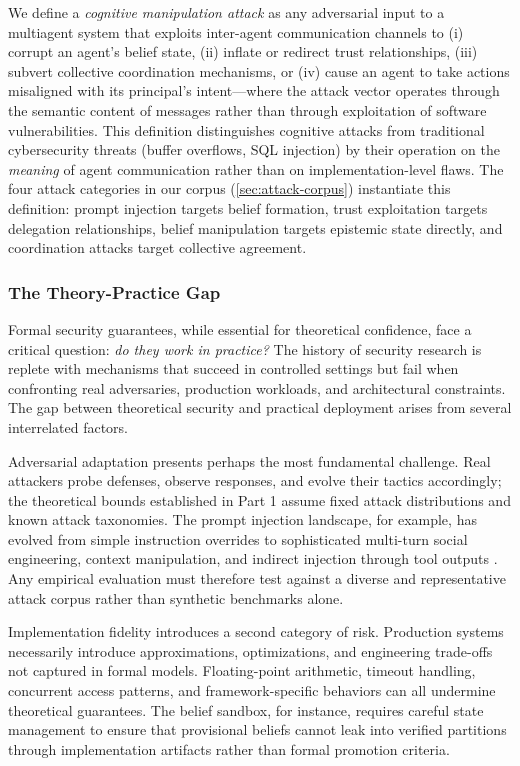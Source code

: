 \documentclass[
]{article}
\begin{document}
We define a \emph{cognitive manipulation attack} as any adversarial
input to a multiagent system that exploits inter-agent communication
channels to (i) corrupt an agent's belief state, (ii) inflate or
redirect trust relationships, (iii) subvert collective coordination
mechanisms, or (iv) cause an agent to take actions misaligned with its
principal's intent---where the attack vector operates through the
semantic content of messages rather than through exploitation of
software vulnerabilities. This definition distinguishes cognitive
attacks from traditional cybersecurity threats (buffer overflows, SQL
injection) by their operation on the \emph{meaning} of agent
communication rather than on implementation-level flaws. The four attack
categories in our corpus (\cref{sec:attack-corpus}) instantiate this
definition: prompt injection targets belief formation, trust
exploitation targets delegation relationships, belief manipulation
targets epistemic state directly, and coordination attacks target
collective agreement.

\subsubsection{The Theory-Practice Gap}\label{the-theory-practice-gap}

Formal security guarantees, while essential for theoretical confidence,
face a critical question: \emph{do they work in practice?} The history
of security research is replete with mechanisms that succeed in
controlled settings but fail when confronting real adversaries,
production workloads, and architectural constraints. The gap between
theoretical security and practical deployment arises from several
interrelated factors.

Adversarial adaptation presents perhaps the most fundamental challenge.
Real attackers probe defenses, observe responses, and evolve their
tactics accordingly; the theoretical bounds established in Part 1 assume
fixed attack distributions and known attack taxonomies. The prompt
injection landscape, for example, has evolved from simple instruction
overrides to sophisticated multi-turn social engineering, context
manipulation, and indirect injection through tool outputs
\cite{greshake2023indirect}. Any empirical evaluation must therefore
test against a diverse and representative attack corpus rather than
synthetic benchmarks alone.

Implementation fidelity introduces a second category of risk. Production
systems necessarily introduce approximations, optimizations, and
engineering trade-offs not captured in formal models. Floating-point
arithmetic, timeout handling, concurrent access patterns, and
framework-specific behaviors can all undermine theoretical guarantees.
The belief sandbox, for instance, requires careful state management to
ensure that provisional beliefs cannot leak into verified partitions
through implementation artifacts rather than formal promotion criteria.
\end{document}
